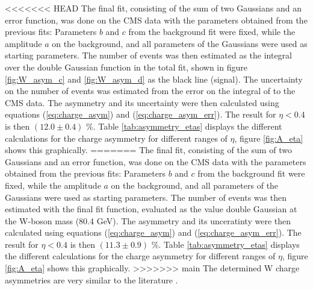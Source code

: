 \documentclass[%
 reprint,
 amsmath,amssymb,
 aps,
]{revtex4-2}
\begin{document}
<<<<<<< HEAD
The final fit, consisting of the sum of two Gaussians and an error function, was done on the CMS data with the parameters obtained from the previous fits: Parameters $b$ and $c$ from the background fit were fixed, while the amplitude $a$ on the background, and all parameters of the Gaussians were used as starting parameters. The number of events was then estimated as the integral over the double Gaussian function in the total fit, shown in figure \ref{fig:W_asym_c} and \ref{fig:W_asym_d} as the black line (signal). The uncertainty on the number of events was estimated from the error on the integral of to the CMS data. 
The asymmetry and its uncertainty were then calculated using equations (\ref{eq:charge_asym}) and (\ref{eq:charge_asym_err}). The result for $\eta < 0.4$ is then  $(12.0 \pm 0.4)$ \%. Table \ref{tab:asymmetry_etas} displays the different calculations for the charge asymmetry for different ranges of $\eta$, figure \ref{fig:A_eta} shows this graphically. 
=======
The final fit, consisting of the sum of two Gaussians and an error function, was done on the CMS data with the parameters obtained from the previous fits: Parameters $b$ and $c$ from the background fit were fixed, while the amplitude $a$ on the background, and all parameters of the Gaussians were used as starting parameters. The number of events was then estimated with the final fit function, evaluated as the value double Gaussian at the W-boson mass (80.4 GeV). 
The asymmetry and its unceratinty were then calculated using equations (\ref{eq:charge_asym}) and (\ref{eq:charge_asym_err}). The result for $\eta < 0.4$ is then $(11.3 \pm 0.9)$ \%. Table \ref{tab:asymmetry_etas} displays the different calculations for the charge asymmetry for different ranges of $\eta$, figure \ref{fig:A_eta} shows this graphically. 
>>>>>>> main
The determined W charge asymmetries are very similar to the literature \cite{cms_collaboration_measurements_2020, saha_measurement_2013}.
\end{document}
